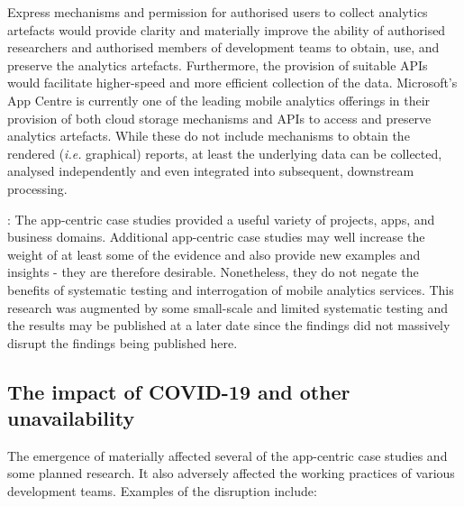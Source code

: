 Express mechanisms and permission for authorised users to collect analytics artefacts would provide clarity and materially improve the ability of authorised researchers and authorised members of development teams to obtain, use, and preserve the analytics artefacts. Furthermore, the provision of suitable APIs would facilitate higher-speed and more efficient collection of the data. Microsoft's App Centre is currently one of the leading mobile analytics offerings in their provision of both cloud storage mechanisms and APIs to access and preserve analytics artefacts. While these do not include mechanisms to obtain the rendered (\emph{i.e.} graphical) reports, at least the underlying data can be collected, analysed independently and even integrated into subsequent, downstream processing.  


: 
The app-centric case studies provided a useful variety of projects, apps, and business domains. Additional app-centric case studies may well increase the weight of at least some of the evidence and also provide new examples and insights - they are therefore desirable. Nonetheless, they do not negate the benefits of systematic testing and interrogation of mobile analytics services. This research was augmented by some small-scale and limited systematic testing and the results may be published at a later date since the findings did not massively disrupt the findings being published here.

\afterpage{\clearpage}

\subsection{The impact of COVID-19 and other unavailability}
The emergence of  materially affected several of the app-centric case studies and some planned research. It also adversely affected the working practices of various development teams.
Examples of the disruption include:

